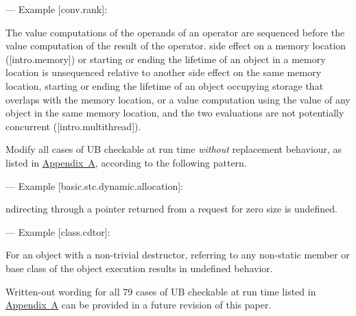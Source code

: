 {--- Example [conv.rank]:

\begin{adjustwidth}{0.5cm}{0.5cm}
The value computations of the operands of an operator are sequenced before the value computation of the result of the operator.   side effect on a memory location ([intro.memory]) or starting or ending the lifetime of an object in a memory location is unsequenced relative to another side effect on the same memory location, starting or ending the lifetime of an object occupying storage that overlaps with the memory location, or a value computation using the value of any object in the same memory location, and the two evaluations are not potentially concurrent ([intro.multithread]).
\end{adjustwidth}

Modify all cases of UB checkable at run time \emph{without} replacement behaviour, as listed in \hyperref[appendix]{Appendix~A}, according to the following pattern. 

--- Example [basic.stc.dynamic.allocation]:

\begin{adjustwidth}{0.5cm}{0.5cm}
ndirecting through a pointer  returned from a request for zero size is undefined.
\end{adjustwidth}

--- Example [class.cdtor]:

\begin{adjustwidth}{0.5cm}{0.5cm}
For an object with a non-trivial destructor, referring to any non-static member or base class of the object  execution results in undefined behavior.
\end{adjustwidth}

Written-out wording for all 79 cases of UB checkable at run time listed in \hyperref[appendix]{Appendix~A} can be provided in a future revision of this paper.


}
